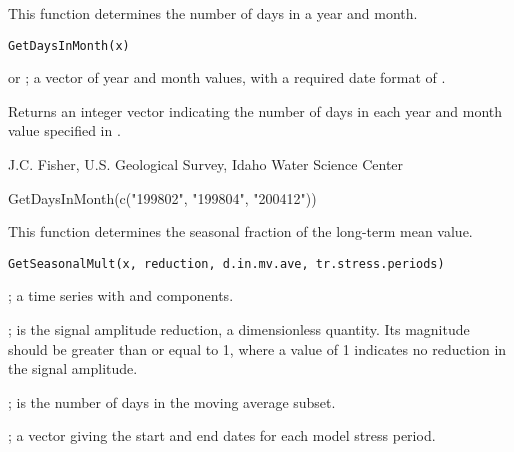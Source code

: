 \documentclass[letterpaper]{book}
\begin{document}
%
\begin{Description}\relax
This function determines the number of days in a year and month.
\end{Description}
%
\begin{Usage}
\begin{verbatim}
GetDaysInMonth(x)
\end{verbatim}
\end{Usage}
%
\begin{Arguments}
\begin{ldescription}
\item[\code{x}]  or ; a vector of year and month values, with a required date format of .
\end{ldescription}
\end{Arguments}
%
\begin{Value}
Returns an integer vector indicating the number of days in each year and month value specified in .
\end{Value}
%
\begin{Author}\relax
J.C. Fisher, U.S. Geological Survey, Idaho Water Science Center
\end{Author}
%
\begin{Examples}
\begin{ExampleCode}
GetDaysInMonth(c("199802", "199804", "200412"))
\end{ExampleCode}
\end{Examples}
%
\begin{Description}\relax
This function determines the seasonal fraction of the long-term mean value.
\end{Description}
%
\begin{Usage}
\begin{verbatim}
GetSeasonalMult(x, reduction, d.in.mv.ave, tr.stress.periods)
\end{verbatim}
\end{Usage}
%
\begin{Arguments}
\begin{ldescription}
\item[\code{x}] ; a time series with  and  components.
\item[\code{reduction}] ; is the signal amplitude reduction, a dimensionless quantity.
Its magnitude should be greater than or equal to 1, where a value of 1 indicates no reduction in the signal amplitude.
\item[\code{d.in.mv.ave}] ; is the number of days in the moving average subset.
\item[\code{tr.stress.periods}] ; a vector giving the start and end dates for each model stress period.
\end{ldescription}
\end{Arguments}
\end{document}
